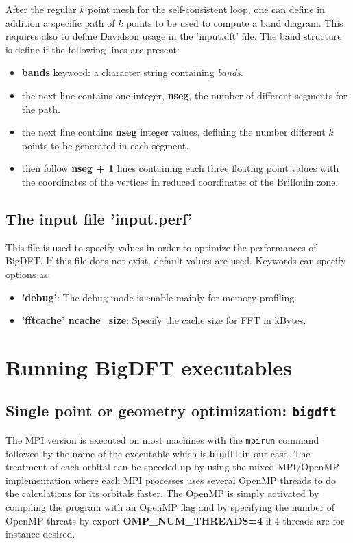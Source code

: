 \documentclass[a4paper,11pt]{report}
\begin{document}
After the regular $k$ point mesh for the self-consistent loop, one can
define in addition a specific path of $k$ points to be used to compute
a band diagram. This requires also to define Davidson usage in the
'input.dft' file. The band structure is define if the following lines
are present:
\begin{itemize}
  \item \textbf{bands} keyword: a character string containing
\emph{bands}.
  \item the next line contains one integer, \textbf{nseg}, the number
of different segments for the path.
  \item the next line contains \textbf{nseg} integer values, defining
the number different $k$ points to be generated in each segment.
  \item then follow \textbf{nseg + 1} lines containing each three floating
point values with the coordinates of the vertices in reduced
coordinates of the Brillouin zone.
\end{itemize}


\section{The input file 'input.perf'}
This file is used to specify values in order to optimize the performances of BigDFT. If this file
does not exist, default values are used. Keywords can specify options as:
\begin{itemize}
  \item  \textbf{'debug'}: The debug mode is enable mainly for memory profiling.
  \item  \textbf{'fftcache' ncache\_size}: Specify the cache size for FFT in kBytes.
\end{itemize}


\chapter{ Running BigDFT executables}

\section{Single point or geometry optimization: \texttt{bigdft}}
The MPI version is executed on most machines with the \texttt{mpirun} command followed by the name of the executable which is 
\texttt{bigdft} in our case.
The treatment of each orbital can be speeded up by using the mixed MPI/OpenMP implementation 
where each MPI processes uses several OpenMP threads to do the calculations for its orbitals faster. 
The OpenMP is simply activated by compiling the program with an OpenMP flag and by specifying the number of OpenMP threats by
export \textbf{OMP\_NUM\_THREADS=4} if 4 threads are for instance desired.
\end{document}
